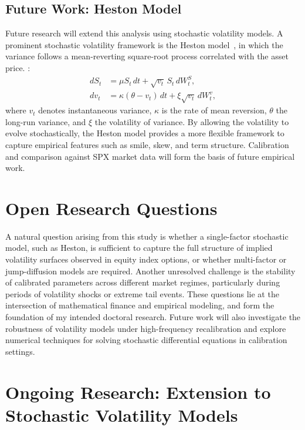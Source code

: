 \documentclass[12pt]{article}
\begin{document}
\subsection{Future Work: Heston Model}
Future research will extend this analysis using stochastic volatility models. A prominent stochastic volatility framework is the Heston model~\cite{heston1993closed}, in which the variance follows a mean-reverting square-root process correlated with the asset price.
:
\begin{equation}
\begin{aligned}
dS_t &= \mu S_t\,dt + \sqrt{v_t}\, S_t\, dW_t^S, \\
dv_t &= \kappa(\theta - v_t)\,dt + \xi \sqrt{v_t}\, dW_t^v,
\end{aligned}
\end{equation}
where $v_t$ denotes instantaneous variance, $\kappa$ is the rate of mean reversion, $\theta$ the long-run variance, and $\xi$ the volatility of variance. By allowing the volatility to evolve stochastically, the Heston model provides a more flexible framework to capture empirical features such as smile, skew, and term structure. Calibration and comparison against SPX market data will form the basis of future empirical work.

\section{Open Research Questions}
A natural question arising from this study is whether a single-factor stochastic model, such as Heston, is sufficient to capture the full structure of implied volatility surfaces observed in equity index options, or whether multi-factor or jump-diffusion models are required. Another unresolved challenge is the stability of calibrated parameters across different market regimes, particularly during periods of volatility shocks or extreme tail events. These questions lie at the intersection of mathematical finance and empirical modeling, and form the foundation of my intended doctoral research. Future work will also investigate the robustness of volatility models under high-frequency recalibration and explore numerical techniques for solving stochastic differential equations in calibration settings.


\section{Ongoing Research: Extension to Stochastic Volatility Models}
\end{document}
